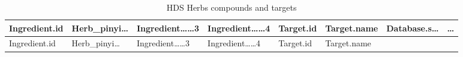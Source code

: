\documentclass[
]{article}
\begin{document}
\begin{longtable}[]{@{}llllllll@{}}
\caption{\label{tab:HDS-Herbs-compounds-and-targets}HDS Herbs compounds and targets}\tabularnewline
\toprule
\begin{minipage}[b]{0.11\columnwidth}\raggedright
Ingredient.id\strut
\end{minipage} & \begin{minipage}[b]{0.11\columnwidth}\raggedright
Herb\_pinyi\ldots{}\strut
\end{minipage} & \begin{minipage}[b]{0.14\columnwidth}\raggedright
Ingredient\ldots\ldots3\strut
\end{minipage} & \begin{minipage}[b]{0.14\columnwidth}\raggedright
Ingredient\ldots\ldots4\strut
\end{minipage} & \begin{minipage}[b]{0.08\columnwidth}\raggedright
Target.id\strut
\end{minipage} & \begin{minipage}[b]{0.09\columnwidth}\raggedright
Target.name\strut
\end{minipage} & \begin{minipage}[b]{0.11\columnwidth}\raggedright
Database.s\ldots{}\strut
\end{minipage} & \begin{minipage}[b]{0.03\columnwidth}\raggedright
\ldots{}\strut
\end{minipage}\tabularnewline
\midrule
\endfirsthead
\toprule
\begin{minipage}[b]{0.11\columnwidth}\raggedright
Ingredient.id\strut
\end{minipage} & \begin{minipage}[b]{0.11\columnwidth}\raggedright
Herb\_pinyi\ldots{}\strut
\end{minipage} & \begin{minipage}[b]{0.14\columnwidth}\raggedright
Ingredient\ldots\ldots3\strut
\end{minipage} & \begin{minipage}[b]{0.14\columnwidth}\raggedright
Ingredient\ldots\ldots4\strut
\end{minipage} & \begin{minipage}[b]{0.08\columnwidth}\raggedright
Target.id\strut
\end{minipage} & \begin{minipage}[b]{0.09\columnwidth}\raggedright
Target.name\strut
\end{minipage} & \begin{minipage}[b]{0.11\columnwidth}\raggedright

\end{minipage}
\end{longtable}
\end{document}
